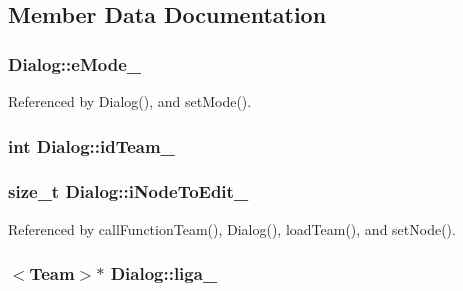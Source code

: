 \subsection{Member Data Documentation}
\hypertarget{class_dialog_a99d3ef596f183ccf2d69c3b465989102}{}
\subsubsection[{e\+Mode\+\_\+}]{ Dialog\+::e\+Mode\+\_\+\hspace{0.3cm}{\ttfamily [private]}}\label{class_dialog_a99d3ef596f183ccf2d69c3b465989102}


Referenced by Dialog(), and set\+Mode().

\hypertarget{class_dialog_af05db46d671e032a4e51e4068f32fb06}{}
\subsubsection[{id\+Team\+\_\+}]{\setlength{\rightskip}{0pt plus 5cm}int Dialog\+::id\+Team\+\_\+\hspace{0.3cm}{\ttfamily [private]}}\label{class_dialog_af05db46d671e032a4e51e4068f32fb06}
\hypertarget{class_dialog_a77bd4ac2499af67029f8f00d682ffde9}{}
\subsubsection[{i\+Node\+To\+Edit\+\_\+}]{\setlength{\rightskip}{0pt plus 5cm}size\+\_\+t Dialog\+::i\+Node\+To\+Edit\+\_\+\hspace{0.3cm}{\ttfamily [private]}}\label{class_dialog_a77bd4ac2499af67029f8f00d682ffde9}


Referenced by call\+Function\+Team(), Dialog(), load\+Team(), and set\+Node().

\hypertarget{class_dialog_a91cdee063ecd915858353d07f2e50eb2}{}
\subsubsection[{liga\+\_\+}]{$<${\bf Team}$>$$\ast$ Dialog\+::liga\+\_\+\hspace{0.3cm}{\ttfamily [private]}}\label{class_dialog_a91cdee063ecd915858353d07f2e50eb2}


